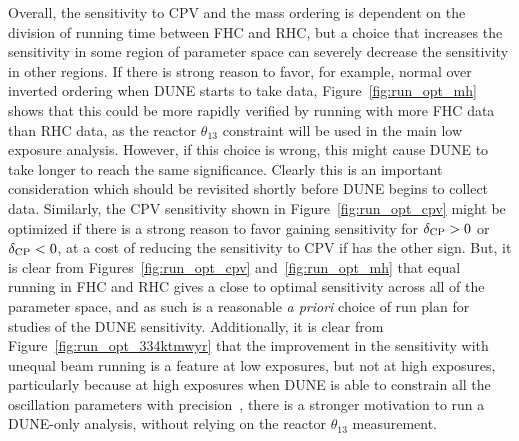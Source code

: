 Overall, the sensitivity to CPV and the mass ordering is dependent on the division of running time between FHC and RHC, but a choice that increases the sensitivity in some region of parameter space can severely decrease the sensitivity in other regions. If there is strong reason to favor, for example, normal over inverted ordering when DUNE starts to take data, Figure~\ref{fig:run_opt_mh} shows that this could be more rapidly verified by running with more FHC data than RHC data, as the reactor $\theta_{13}$ constraint will be used in the main low exposure analysis. However, if this choice is wrong, this might cause DUNE to take longer to reach the same significance. Clearly this is an important consideration which should be revisited shortly before DUNE begins to collect data. Similarly, the CPV sensitivity shown in Figure~\ref{fig:run_opt_cpv} might be optimized if there is a strong reason to favor gaining sensitivity for $\delta_{\rm CP} > 0$ or $\delta_{\rm CP} < 0$, at a cost of reducing the sensitivity to CPV if \deltacp has the other sign. But, it is clear from Figures~\ref{fig:run_opt_cpv} and~\ref{fig:run_opt_mh} that equal running in FHC and RHC gives a close to optimal sensitivity across all of the parameter space, and as such is a reasonable {\it a priori} choice of run plan for studies of the DUNE sensitivity. Additionally, it is clear from Figure~\ref{fig:run_opt_334ktmwyr} that the improvement in the sensitivity with unequal beam running is a feature at low exposures, but not at high exposures, particularly because at high exposures when DUNE is able to constrain all the oscillation parameters with precision~\cite{Abi:2020qib}, there is a stronger motivation to run a DUNE-only analysis, without relying on the reactor $\theta_{13}$ measurement.


